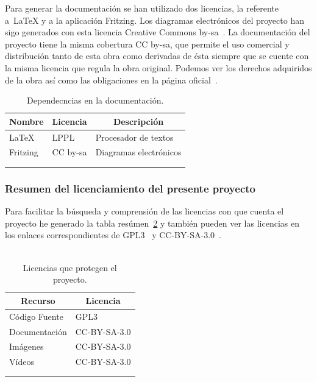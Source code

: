 Para generar la documentación se han utilizado dos licencias, la referente a~\LaTeX{} y a la aplicación Fritzing. Los diagramas electrónicos del proyecto han sigo generados con esta licencia Creative Commons by-sa~\cite{lic:CCbysa3}. La documentación del proyecto tiene la misma cobertura CC by-sa, que permite el uso comercial y distribución tanto de esta obra como derivadas de ésta siempre que se cuente con la misma licencia que regula la obra original. Podemos ver los derechos adquiridos de la obra así como las obligaciones en la página oficial~\cite{lic:CCbysa3}.

\begin{longtable}[c]{@{}lll@{}}
\toprule
\multicolumn{1}{c}{\textbf{Nombre}} & \multicolumn{1}{c}{\textbf{Licencia}} & \multicolumn{1}{c}{\textbf{Descripción}} \\* \midrule
\endfirsthead
%
\endhead
%
\bottomrule
\endfoot
%
\endlastfoot
%
\LaTeX{}~\cite{wiki:latex} & LPPL & Procesador de textos \\
Fritzing & CC by-sa & Diagramas electrónicos \\* \bottomrule \\
\caption{Dependecncias en la documentación.}
\label{tab:my-table}\\
\end{longtable}


\subsubsection{Resumen del licenciamiento del presente proyecto}
Para facilitar la búsqueda y comprensión de las licencias con que cuenta el proyecto he generado la tabla resúmen~\ref{tab:licproy} y también pueden ver las licencias en los enlaces correspondientes de GPL3~\cite{lic:GPL3} y CC-BY-SA-3.0~\cite{lic:CCbysa3}.~\\~\\ %

\begin{longtable}[c]{@{}ll@{}}
\toprule
\multicolumn{1}{c}{\textbf{Recurso}} & \multicolumn{1}{c}{\textbf{Licencia}} \\* \midrule
\endfirsthead
%
\endhead
%
\bottomrule
\endfoot
%
\endlastfoot
%
Código Fuente & GPL3 \\
Documentación & CC-BY-SA-3.0 \\
Imágenes & CC-BY-SA-3.0 \\
Vídeos & CC-BY-SA-3.0 \\* \bottomrule \\
\caption{Licencias que protegen el proyecto.}
\label{tab:licproy}\\
\end{longtable}


